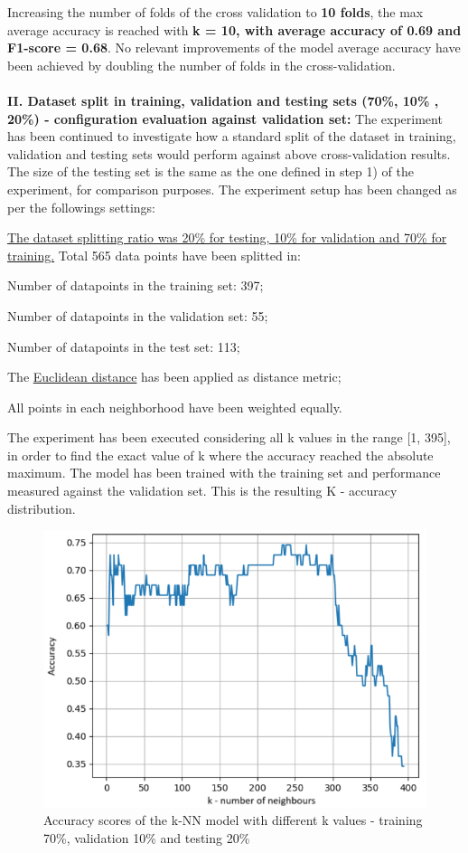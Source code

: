 \documentclass[11pt,a4paper]{article}
\newcommand{\SubItem}[1]{
  {\setlength\itemindent{13pt} \item[◦] #1}
}
\begin{document}
Increasing the number of folds of the cross validation to \textbf{10 folds}, the max average accuracy is reached with \textbf{k = 10, with average accuracy of 0.69 and F1-score = 0.68}. No relevant improvements of the model average accuracy have been achieved by doubling the number of folds in the cross-validation.
\\
\\
\textbf{II. Dataset split in training, validation and testing sets (70\%, 10\% , 20\%) - configuration evaluation against validation set:}
The experiment has been continued to investigate how a standard split of the dataset in training, validation and testing sets would perform against above cross-validation results. The size of the testing set is the same as the one defined in step 1) of the experiment, for comparison purposes. The experiment setup has been changed as per the followings settings:
\begin{itemize}
\item \uline{The dataset splitting ratio was 20\% for testing, 10\% for validation and 70\% for training.} Total 565 data points have been splitted in:
\SubItem{Number of datapoints in the training set: 397;}
\SubItem{Number of datapoints in the validation set: 55;}
\SubItem{Number of datapoints in the test set: 113;}
\item The \uline{Euclidean distance} has been applied as distance metric;
\item All points in each neighborhood have been weighted equally.
\end{itemize}
The experiment has been executed considering all k values in the range [1, 395], in order to find the exact value of k where the accuracy reached the absolute maximum. The model has been trained with the training set and performance measured against the validation set. This is the resulting K - accuracy distribution.
\begin{figure}
    \centering
    \includegraphics[width=1\linewidth]{ICS-5110-Fig-10.png}
    \caption{Accuracy scores of the k-NN model with different k values - training 70\%,  validation 10\% and testing 20\%}
    \label{fig:Accuracy scores of the k-NN model with different k values in training 70/10/20}
\end{figure}
\end{document}
